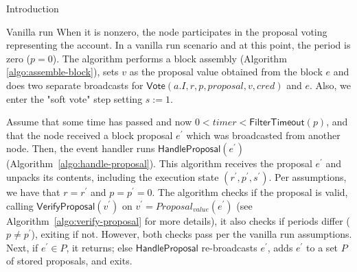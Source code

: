 \documentclass[10pt,a4paper]{article}
\begin{document}
\begin{section}{Introduction}
\begin{subsection}{Vanilla run}
When it is nonzero, the node participates in the proposal voting representing the account.
In a vanilla run scenario and at this point, the period is zero ($p=0$). 
The algorithm performs a block assembly (Algorithm \ref{algo:assemble-block}), 
sets $v$ as the proposal value obtained from the block $e$ and does two separate 
broadcasts for $\mathsf{Vote}(a.I, r,p, proposal, v, cred)$ and $e$.
Also, we enter the "soft vote" step setting $s:=1$.


%


Assume that some time has passed and now $0<timer<\mathsf{FilterTimeout}(p)$, and that 
the node received a block proposal $e^\prime$ which was broadcasted from another node. 
Then, the event handler runs $\mathsf{HandleProposal}(e^\prime)$ (Algorithm~\ref{algo:handle-proposal}).
This algorithm receives the proposal $e^\prime$ and unpacks its contents,
including the execution state $(r^\prime,p^\prime,s^\prime)$.
Per assumptions, we have that $r=r^\prime$ and $p=p^\prime=0$.
The algorithm checks if the proposal is valid, calling $\mathsf{VerifyProposal}(v^\prime)$ 
on $v^\prime=Proposal_{value}(e^\prime)$ (see Algorithm~\ref{algo:verify-proposal} for more details),
it also checks if periods differ ($p\neq p^\prime$), exiting if not. However, both checks pass per 
the vanilla run assumptions.
Next, if $e^\prime\in P$, it returns; else $\mathsf{HandleProposal}$ re-broadcasts $e^\prime$, 
adds $e^\prime$ to a set $P$ of stored proposals, and exits.


\end{subsection}
\end{section}
\end{document}
